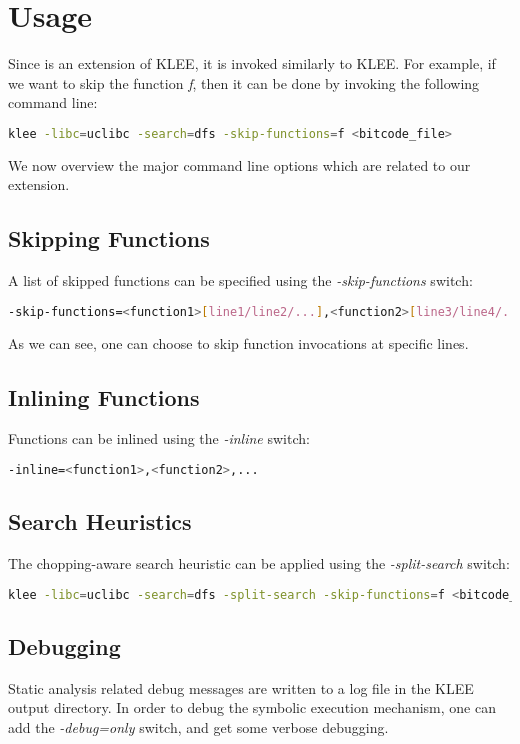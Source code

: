 \section{Usage}
Since \toolname is an extension of KLEE, it is invoked similarly to KLEE.
For example, if we want to skip the function \textit{f}, then it can be done by invoking the following command line:
\begin{lstlisting}[language=bash,linewidth=.4\textwidth,numbers=none]
klee -libc=uclibc -search=dfs -skip-functions=f <bitcode_file>
\end{lstlisting}
We now overview the major command line options which are related to our extension.

\subsection{Skipping Functions}
A list of skipped functions can be specified using the \textit{-skip-functions} switch:
\begin{lstlisting}[language=bash,linewidth=.4\textwidth,numbers=none]
-skip-functions=<function1>[line1/line2/...],<function2>[line3/line4/...],...
\end{lstlisting}
As we can see, one can choose to skip function invocations at specific lines.

\subsection{Inlining Functions}
Functions can be inlined using the \textit{-inline} switch:
\begin{lstlisting}[language=bash,linewidth=.4\textwidth,numbers=none]
-inline=<function1>,<function2>,...
\end{lstlisting}

\subsection{Search Heuristics}
The chopping-aware search heuristic can be applied using the \textit{-split-search} switch:
\begin{lstlisting}[language=bash,linewidth=.4\textwidth,numbers=none]
klee -libc=uclibc -search=dfs -split-search -skip-functions=f <bitcode_file>
\end{lstlisting}

\subsection{Debugging}
Static analysis related debug messages are written to a log file in the KLEE output directory.
In order to debug the symbolic execution mechanism,
one can add the \textit{-debug=only} switch, and get some verbose debugging.

